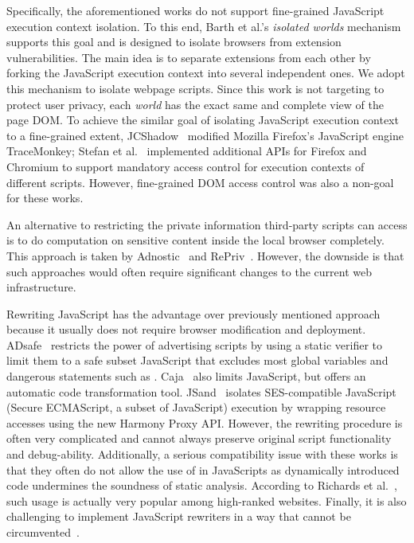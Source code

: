Specifically, the aforementioned works do not support fine-grained JavaScript execution context isolation.  To this end, Barth et al.'s \emph{isolated worlds} mechanism~\cite{extension} supports this goal and is designed to isolate browsers from extension vulnerabilities.  The main idea is to separate extensions from each other by forking the JavaScript execution context into several independent ones.  We adopt this mechanism to isolate webpage scripts.  Since this work is not targeting to protect user privacy, each \emph{world} has the exact same and complete view of the page DOM.  To achieve the similar goal of isolating JavaScript execution context to a fine-grained extent, JCShadow~\cite{JCShadow} modified Mozilla Firefox's JavaScript engine TraceMonkey; Stefan et al.~\cite{COWL} implemented additional APIs for Firefox and Chromium to support mandatory access control for execution contexts of different scripts.  However, fine-grained DOM access control was also a non-goal for these works.  

An alternative to restricting the private information third-party scripts can access is to do computation on sensitive content inside the local browser completely.  This approach is taken by Adnostic~\cite{Adnostic} and RePriv~\cite{RePriv}. However, the downside is that such approaches would often require significant changes to the current web infrastructure.

 Rewriting JavaScript has the advantage over previously mentioned approach because it usually does not require browser modification and deployment.  ADsafe~\cite{ADsafe} restricts the power of advertising scripts by using a static verifier to limit them to a safe subset JavaScript that excludes most global variables and dangerous statements such as .  Caja~\cite{caja} also limits JavaScript, but offers an automatic code transformation tool.  JSand\footnotemark[1]~\cite{Agten:2012:JCC:2420950.2420952} isolates SES-compatible JavaScript (Secure ECMAScript, a subset of JavaScript) execution by wrapping resource accesses using the new Harmony Proxy API.  However, the rewriting procedure is often very complicated and cannot always preserve original script functionality and debug-ability.  Additionally, a serious compatibility issue with these works is that they often do not allow the use of  in JavaScripts as dynamically introduced code undermines the soundness of static analysis.  According to Richards et al.~\cite{Richards:2010:ADB:1806596.1806598}, such usage is actually very popular among high-ranked websites. Finally, it is also challenging to implement JavaScript rewriters in a way that cannot be circumvented~\cite{JSWrapperBug}.

